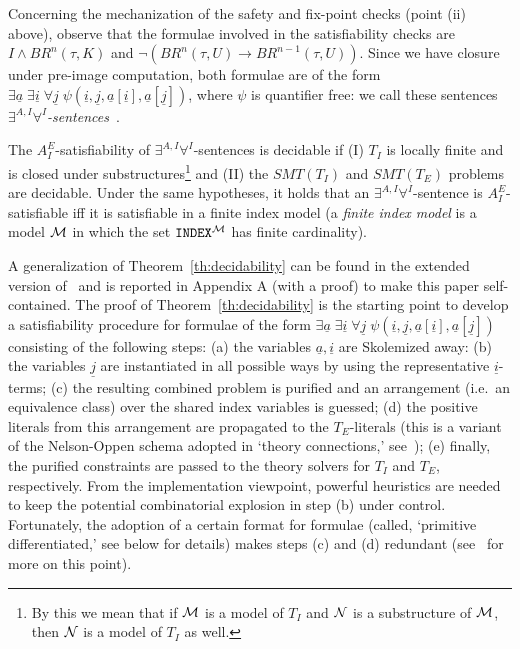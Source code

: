 \documentclass{LMCS}
\newcommand{\ua}{\ensuremath{\underline a}}
\newcommand{\ui}{\ensuremath{\underline i}}
\newcommand{\uj}{\ensuremath{\underline j}}
\newcommand{\cM}{\ensuremath \mathcal M}
\newcommand{\cN}{\ensuremath \mathcal N}
\theoremstyle{plain}\newtheorem{assumption}[thm]{Assumption}
\theoremstyle{plain}\newtheorem{proposition}[thm]{Proposition}
\theoremstyle{plain}\newtheorem{property}[thm]{Property}
\theoremstyle{plain}\newtheorem{example}[thm]{Example}
\theoremstyle{plain}\newtheorem{claim}[thm]{Claim}
\theoremstyle{plain}\newtheorem{lemma}[thm]{Lemma}
\begin{document}
Concerning the mechanization of the safety and fix-point checks (point
(ii) above), observe that the formulae involved in the satisfiability
checks are $I \wedge BR^n(\tau,K)$ and
$\neg(BR^n(\tau, U)\rightarrow BR^{n-1}(\tau, U))$.  Since we have
closure under pre-image computation, both formulae are of the form $
\exists \ua\; \exists \ui\; \forall \uj\; \psi(\ui, \uj, \ua[\ui],
\ua[\uj])$, where $\psi$ is quantifier free: we call these sentences
\emph{$\exists^{A,I}\forall^I$-sentences}~\cite{ijcar08}.
 \begin{thm}\label{th:decidability}
   The $A_I^E$-satisfiability of $\exists^{A,I}\forall^I$-sentences is
   decidable if (I) $T_I$ is locally finite and is closed under
   substructures\footnote{
By this we mean that if $\cM$ is a model of $T_I$ and $\cN$ is a
     substructure of $\cM$, then $\cN$ is a model of $T_I$ as well.  }
   and (II) the $SMT(T_I)$ and $SMT(T_E)$ problems are
   decidable. Under the same hypotheses, it holds that an
   $\exists^{A,I}\forall^I$-sentence is $A_I^E$-satisfiable iff it is
   satisfiable in a finite index model (a \emph{finite index model} is
   a model $\cM$ in which the set $\texttt{INDEX}^{\cM}$ has finite
   cardinality).
\end{thm}
A generalization of Theorem~\ref{th:decidability} can be found in the
extended version of~\cite{ijcar08} and is reported in Appendix A (with
a proof) to make this paper self-contained.  The proof of
Theorem~\ref{th:decidability} is the starting point to develop a
satisfiability procedure for formulae of the form $ \exists \ua\;
\exists \ui\; \forall \uj\; \psi(\ui, \uj, \ua[\ui], \ua[\uj])$
consisting of the following steps: (a) the variables $\ua, \ui$ are
Skolemized away: (b) the variables $\uj$ are instantiated in all
possible ways by using the representative $\ui$-terms; (c) the
resulting combined problem is purified and an arrangement (i.e.\ an
equivalence class) over the shared index variables is guessed; (d) the
positive literals from this arrangement are propagated to the
$T_E$-literals (this is a variant of the Nelson-Oppen schema adopted
in `theory connections,' see~\cite{BaGh}); (e) finally, the purified
constraints are passed to the theory solvers for $T_I$ and $T_E$,
respectively.  From the implementation viewpoint, powerful heuristics
are needed~\cite{afm09} to keep the potential combinatorial explosion
in step (b) under control.  Fortunately, the adoption of a certain
format for formulae (called, `primitive differentiated,' see below for
details) makes steps (c) and (d) redundant (see~\cite{afm09} for more
on this point).
\end{document}
